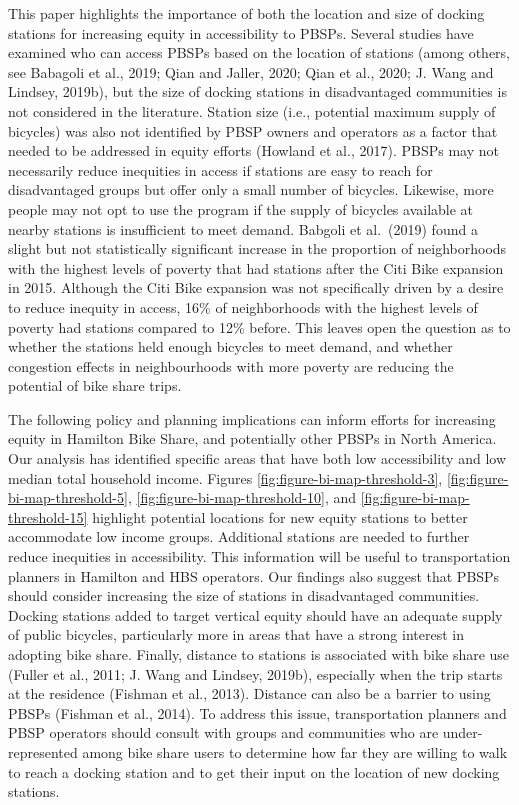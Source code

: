 \documentclass[]{elsarticle} %
\begin{document}
This paper highlights the importance of both the location and size of
docking stations for increasing equity in accessibility to PBSPs.
Several studies have examined who can access PBSPs based on the location
of stations (among others, see Babagoli et al., 2019; Qian and Jaller,
2020; Qian et al., 2020; J. Wang and Lindsey, 2019b), but the size of
docking stations in disadvantaged communities is not considered in the
literature. Station size (i.e., potential maximum supply of bicycles)
was also not identified by PBSP owners and operators as a factor that
needed to be addressed in equity efforts (Howland et al., 2017). PBSPs
may not necessarily reduce inequities in access if stations are easy to
reach for disadvantaged groups but offer only a small number of
bicycles. Likewise, more people may not opt to use the program if the
supply of bicycles available at nearby stations is insufficient to meet
demand. Babgoli et al.~(2019) found a slight but not statistically
significant increase in the proportion of neighborhoods with the highest
levels of poverty that had stations after the Citi Bike expansion in
2015. Although the Citi Bike expansion was not specifically driven by a
desire to reduce inequity in access, 16\% of neighborhoods with the
highest levels of poverty had stations compared to 12\% before. This
leaves open the question as to whether the stations held enough bicycles
to meet demand, and whether congestion effects in neighbourhoods with
more poverty are reducing the potential of bike share trips.

The following policy and planning implications can inform efforts for
increasing equity in Hamilton Bike Share, and potentially other PBSPs in
North America. Our analysis has identified specific areas that have both
low accessibility and low median total household income. Figures
\ref{fig:figure-bi-map-threshold-3},
\ref{fig:figure-bi-map-threshold-5},
\ref{fig:figure-bi-map-threshold-10}, and
\ref{fig:figure-bi-map-threshold-15} highlight potential locations for
new equity stations to better accommodate low income groups. Additional
stations are needed to further reduce inequities in accessibility. This
information will be useful to transportation planners in Hamilton and
HBS operators. Our findings also suggest that PBSPs should consider
increasing the size of stations in disadvantaged communities. Docking
stations added to target vertical equity should have an adequate supply
of public bicycles, particularly more in areas that have a strong
interest in adopting bike share. Finally, distance to stations is
associated with bike share use (Fuller et al., 2011; J. Wang and
Lindsey, 2019b), especially when the trip starts at the residence
(Fishman et al., 2013). Distance can also be a barrier to using PBSPs
(Fishman et al., 2014). To address this issue, transportation planners
and PBSP operators should consult with groups and communities who are
under-represented among bike share users to determine how far they are
willing to walk to reach a docking station and to get their input on the
location of new docking stations.
\end{document}
